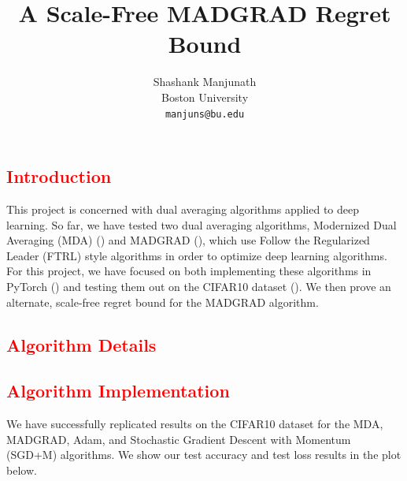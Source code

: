 \documentclass{article}
\title{A Scale-Free MADGRAD Regret Bound}
\author{
  Shashank Manjunath \\
  Boston University \\
  \texttt{manjuns@bu.edu} \\
}
\newcommand{\todo}[1]{\textcolor{red}{#1}}
\begin{document}
\maketitle

\todo{\section{Introduction}}

This project is concerned with dual averaging algorithms applied to deep learning. So far, we have tested two dual
averaging algorithms, Modernized Dual Averaging (MDA) (\cite{jelassi_dual_2020}) and MADGRAD
(\cite{defazio_adaptivity_nodate}), which use Follow the Regularized Leader (FTRL) style algorithms in order to optimize
deep learning algorithms. For this project, we have focused on both implementing these algorithms in PyTorch
(\cite{paszke_pytorch_2019}) and testing them out on the CIFAR10 dataset (\cite{krizhevsky_learning_nodate}). We then
prove an alternate, scale-free regret bound for the MADGRAD algorithm.

\todo{\section{Algorithm Details}}

\todo{\section{Algorithm Implementation}}

We have successfully replicated results on the CIFAR10 dataset for the MDA, MADGRAD, Adam, and Stochastic
Gradient Descent with Momentum (SGD+M) algorithms. We show our test accuracy and test loss results in the plot below.
\end{document}
